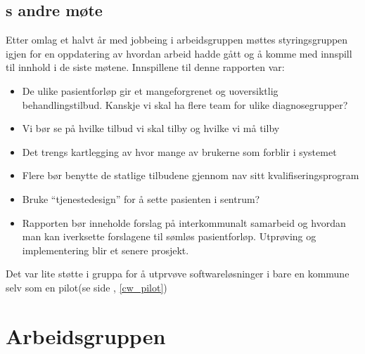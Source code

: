 \documentclass[11pt]{report} %
\begin{document}
                  \subsection{s andre møte}\label{sec:stygr_2}
                    Etter omlag et halvt år med jobbeing i arbeidsgruppen møttes styringsgruppen igjen \cite{strgr_mref13-2} for en oppdatering av hvordan arbeid hadde gått og å komme med innspill til innhold i de siste møtene. Innspillene til denne rapporten var:
                    \begin{itemize}
                    \item De ulike pasientforløp gir et mangeforgrenet og uoversiktlig behandlingstilbud. Kanskje vi skal ha flere team for ulike diagnosegrupper?\\
                    \item Vi bør se på hvilke tilbud vi skal tilby og hvilke vi må tilby\\
                    \item Det trengs kartlegging av hvor mange av brukerne som forblir i systemet\\
                    \item Flere bør benytte de statlige tilbudene gjennom nav sitt kvalifiseringsprogram\\
                    \item Bruke “tjenestedesign” for å sette pasienten i sentrum?\\
                    \item Rapporten bør inneholde forslag på interkommunalt samarbeid og hvordan man kan iverksette forslagene til sømløs pasientforløp. Utprøving og implementering blir et senere prosjekt.\\
                    \end{itemize}
                    Det var lite støtte i gruppa for å utprvøve softwareløsninger i bare en kommune selv som en pilot(se side \pageref{cw_pilot}, \ref{cw_pilot})

                \section{Arbeidsgruppen}\label{sec:m_agr}
\end{document}
